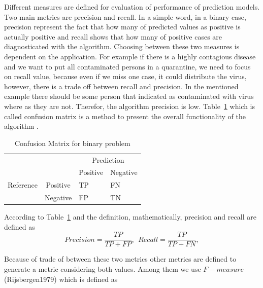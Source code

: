 Different measures are defined for evaluation of performance of prediction models. Two main metrics are precision and recall. In a simple word, in a binary case, precision represent the fact that how many of predicted values as positive is actually positive and recall shows that how many of positive cases are diagnosticated with the algorithm. Choosing between these two measures is dependent on the application. For example if there is a highly contagious disease and we want to put all contaminated persons in a quarantine, we need to focus on recall value, because even if we miss one case, it could distribute the virus, however, there is a trade off between recall and precision. In the mentioned example there should be some person that indicated as contaminated with virus where as they are not. Therefor, the algorithm precision is low. Table~\ref{tab:confusion_def} which is called confusion matrix is a method to present the overall functionality of the algorithm \citep{Branco_2015}.  


\begin{table}
\centering
\caption{Confusion Matrix for binary problem}
\label{my-label}
\begin{tabular}{llll}
\hline
                                                 &                              & \multicolumn{2}{c}{Prediction}                              \\ \cline{3-4} 
                                                 &                              & \multicolumn{1}{c}{Positive} & \multicolumn{1}{c}{Negative} \\ \cline{2-4} 
\multicolumn{1}{c}{Reference} & \multicolumn{1}{c}{Positive} & TP                           & FN                           \\
\multicolumn{1}{c}{}                             & \multicolumn{1}{c}{Negative} & FP                           & TN                           \\ \hline
\end{tabular}
\label{tab:confusion_def}
\end{table}

According to Table~\ref{tab:confusion_def} and the definition, mathematically, precision and recall are defined as
\begin{equation}
Precision = \frac{TP}{TP+FP}, ~ ~ Recall = \frac{TP}{TP+FN},
\end{equation}

Because of trade of between these two metrics other metrics are defined to generate a metric considering both values. Among them we use $F-measure$ (Rijsbergen1979) which is defined as 

